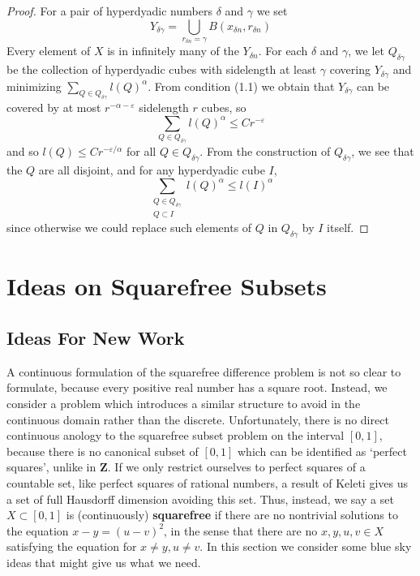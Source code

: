 \documentclass{report}
\theoremstyle{plain}
\theoremstyle{plain}
\begin{document}
\begin{proof}
    For a pair of hyperdyadic numbers $\delta$ and $\gamma$ we set
    \[ Y_{\delta \gamma} = \bigcup_{r_{\delta n} = \gamma} B(x_{\delta n}, r_{\delta n}) \]
    Every element of $X$ is in infinitely many of the $Y_{\delta n}$. For each $\delta$ and $\gamma$, we let $Q_{\delta \gamma}$ be the collection of hyperdyadic cubes with sidelength at least $\gamma$ covering $Y_{\delta \gamma}$ and minimizing $\sum_{Q \in Q_{\delta \gamma}} l(Q)^\alpha$. From condition (1.1) we obtain that $Y_{\delta \gamma}$ can be covered by at most $r^{-\alpha - \varepsilon}$ sidelength $r$ cubes, so
    \[ \sum_{Q \in Q_{\delta \gamma}} l(Q)^\alpha \leq Cr^{-\varepsilon} \]
    and so $l(Q) \leq Cr^{-\varepsilon/\alpha}$ for all $Q \in Q_{\delta \gamma}$. From the construction of $Q_{\delta \gamma}$, we see that the $Q$ are all disjoint, and for any hyperdyadic cube $I$,
    \[ \sum_{\substack{Q \in Q_{\delta \gamma}\\Q \subset I}} l(Q)^\alpha \leq l(I)^\alpha \]
    since otherwise we could replace such elements of $Q$ in $Q_{\delta \gamma}$ by $I$ itself.
\end{proof}






\chapter{Ideas on Squarefree Subsets}

\section{Ideas For New Work}

A continuous formulation of the squarefree difference problem is not so clear to formulate, because every positive real number has a square root. Instead, we consider a problem which introduces a similar structure to avoid in the continuous domain rather than the discrete. Unfortunately, there is no direct continuous anology to the squarefree subset problem on the interval $[0,1]$, because there is no canonical subset of $[0,1]$ which can be identified as `perfect squares', unlike in $\mathbf{Z}$. If we only restrict ourselves to perfect squares of a countable set, like perfect squares of rational numbers, a result of Keleti gives us a set of full Hausdorff dimension avoiding this set. Thus, instead, we say a set $X \subset [0,1]$ is (continuously) {\bf squarefree} if there are no nontrivial solutions to the equation $x - y = (u - v)^2$, in the sense that there are no $x,y,u,v \in X$ satisfying the equation for $x \neq y, u \neq v$. In this section we consider some blue sky ideas that might give us what we need.
\end{document}
